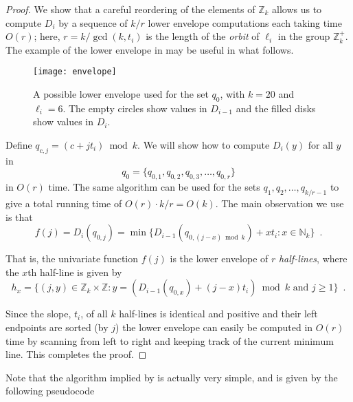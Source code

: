 \documentclass[11pt]{patmorin}
\newcommand{\Z}{\mathbb{Z}}
\newcommand{\N}{\mathbb{N}}
\newcommand{\defeq}{=}
\begin{document}
\begin{proof}
We show that a careful reordering of the elements of $\Z_k$ allows us
to compute $D_i$ by a sequence of $k/r$ lower envelope computations
each taking time $O(r)$; here, $r=k/\gcd(k,t_i)$ is the length of
the \emph{orbit} of $\ell_i$ in the group $\mathbb{Z}_k^+$.  The
example of 
the lower envelope in
 may be useful in what follows.

\begin{figure}
\begin{center}
\texttt{[image: envelope]}
\end{center}
\caption{A possible lower envelope used for the set $q_{0}$, with $k=20$
and $\ell_i=6$.   The empty circles show values in $D_{i-1}$ and
the filled disks show values in $D_i$.}
\end{figure}

Define $q_{c,j} = (c + jt_i)\bmod k$.  We will show how to compute
$D_{i}(y)$ for all $y$ in 
\[ 
    q_{0}=\{q_{0,1}, q_{0,2},q_{0,3},\ldots,q_{0,r}\}
\]
in $O(r)$ time.  The same algorithm can be used for the sets $q_{1},
q_{2}, \ldots, q_{k/r-1}$ to give a total running time of
$O(r)\cdot k/r= O(k)$.
The main observation we use is that
\begin{equation}
    f(j) \defeq D_{i}(q_{0,j}) = \min\{D_{i-1}(q_{0,(j-x)\bmod k})+xt_i :
x\in \N_k\} \enspace .
\end{equation}

That is, the univariate function $f(j)$ is the lower envelope of $r$
\emph{half-lines}, where the $x$th half-line is given by
\[
   h_x = \{(j,y)\in \Z_k\times \Z :
          \mbox{$y=(D_{i-1}(q_{0,x}) + (j-x)t_i)\bmod k$ 
               and $j\ge 1$}\} \enspace . 
\]

Since the slope, $t_i$, of all $k$ half-lines is identical and
positive and their left endpoints are sorted (by $j$) the lower
envelope can easily be computed in $O(r)$ time by scanning from left
to right and keeping track of the current minimum line.  This
completes the proof.  
\end{proof}

Note that the algorithm implied by  is actually very
simple, and is given by the following pseudocode

\begin{algorithmic}[1]
  \ENDFOR
  \ENDFOR
\ENDFOR
\end{algorithmic}
\end{document}
